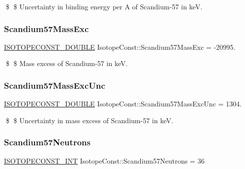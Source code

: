 \$ \$ Uncertainty in binding energy per A of Scandium-\/57 in keV. \mbox{\label{group___isotope_const-_scandium-_sc57_ga06aa97fada8c99640c038e983b62d9ba}} 
\subsubsection{\texorpdfstring{Scandium57\+Mass\+Exc}{Scandium57MassExc}}
{\footnotesize\ttfamily \mbox{\hyperlink{group___isotope_const-_macros_ga8f45a7272ce02c0b4c65c44636ed719a}{I\+S\+O\+T\+O\+P\+E\+C\+O\+N\+S\+T\+\_\+\+D\+O\+U\+B\+LE}} Isotope\+Const\+::\+Scandium57\+Mass\+Exc = -\/20995.}

\$ \$ Mass excess of Scandium-\/57 in keV. \mbox{\label{group___isotope_const-_scandium-_sc57_gac895ce54125c176b176532b05a9278b4}} 
\subsubsection{\texorpdfstring{Scandium57\+Mass\+Exc\+Unc}{Scandium57MassExcUnc}}
{\footnotesize\ttfamily \mbox{\hyperlink{group___isotope_const-_macros_ga8f45a7272ce02c0b4c65c44636ed719a}{I\+S\+O\+T\+O\+P\+E\+C\+O\+N\+S\+T\+\_\+\+D\+O\+U\+B\+LE}} Isotope\+Const\+::\+Scandium57\+Mass\+Exc\+Unc = 1304.}

\$ \$ Uncertainty in mass excess of Scandium-\/57 in keV. \mbox{\label{group___isotope_const-_scandium-_sc57_gad7ead766da420a4698639a63dd109228}} 
\subsubsection{\texorpdfstring{Scandium57\+Neutrons}{Scandium57Neutrons}}
{\footnotesize\ttfamily \mbox{\hyperlink{group___isotope_const-_macros_ga5f18360b3e99483a35c32d789e62621c}{I\+S\+O\+T\+O\+P\+E\+C\+O\+N\+S\+T\+\_\+\+I\+NT}} Isotope\+Const\+::\+Scandium57\+Neutrons = 36}

